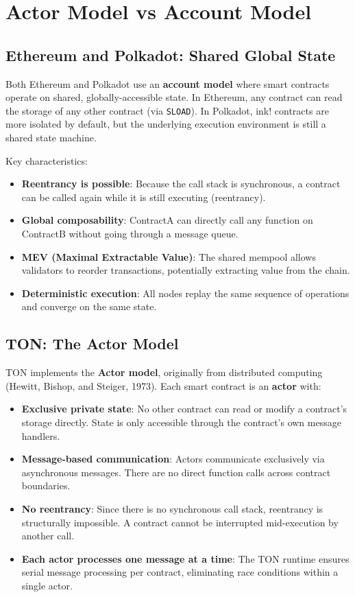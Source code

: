 \section{Actor Model vs Account Model}

\subsection{Ethereum and Polkadot: Shared Global State}

Both Ethereum and Polkadot use an \textbf{account model} where smart contracts
operate on shared, globally-accessible state. In Ethereum, any contract can read
the storage of any other contract (via \texttt{SLOAD}). In Polkadot, ink!
contracts are more isolated by default, but the underlying execution environment
is still a shared state machine.

Key characteristics:
\begin{itemize}
    \item \textbf{Reentrancy is possible}: Because the call stack is synchronous,
          a contract can be called again while it is still executing (reentrancy).
    \item \textbf{Global composability}: ContractA can directly call any function
          on ContractB without going through a message queue.
    \item \textbf{MEV (Maximal Extractable Value)}: The shared mempool allows
          validators to reorder transactions, potentially extracting value from
          the chain.
    \item \textbf{Deterministic execution}: All nodes replay the same sequence
          of operations and converge on the same state.
\end{itemize}

\subsection{TON: The Actor Model}

TON implements the \textbf{Actor model}, originally from distributed computing
(Hewitt, Bishop, and Steiger, 1973). Each smart contract is an \textbf{actor}
with:

\begin{itemize}
    \item \textbf{Exclusive private state}: No other contract can read or modify
          a contract's storage directly. State is only accessible through the
          contract's own message handlers.
    \item \textbf{Message-based communication}: Actors communicate exclusively
          via asynchronous messages. There are no direct function calls across
          contract boundaries.
    \item \textbf{No reentrancy}: Since there is no synchronous call stack,
          reentrancy is structurally impossible. A contract cannot be interrupted
          mid-execution by another call.
    \item \textbf{Each actor processes one message at a time}: The TON runtime
          ensures serial message processing per contract, eliminating race
          conditions within a single actor.
\end{itemize}

